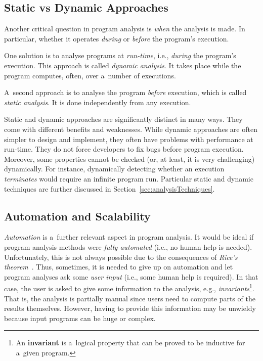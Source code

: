 \subsection{Static vs Dynamic Approaches}

Another critical question in program analysis is \emph{when} the analysis is made. In particular, whether it operates \emph{during} or \emph{before} the program's execution.

One solution is to analyse programs at \emph{run-time}, i.e., \emph{during} the program's execution. This approach is called \emph{dynamic analysis}. It takes place while the program computes, often, over a~number of executions.

A~second approach is to analyse the program \emph{before} execution, which is called \emph{static analysis}. It is done independently from any execution.

Static and dynamic approaches are significantly distinct in many ways. They come with different benefits and weaknesses. While dynamic approaches are often simpler to design and implement, they often have problems with performance at run-time. They do not force developers to fix  bugs before program execution. Moreover, some properties cannot be checked (or, at least, it is very challenging) dynamically. For instance, dynamically detecting whether an execution \emph{terminates} would require an infinite program run. Particular static and dynamic techniques are further discussed in Section~\ref{sec:analysisTechniques}.

\subsection{Automation and Scalability}

\emph{Automation} is a~further relevant aspect in program analysis. It would be ideal if program analysis methods were \emph{fully automated} (i.e., no human help is needed). Unfortunately, this is not always possible due to the consequences of \emph{Rice's theorem}~\cite{rice}. Thus, sometimes, it is needed to give up on automation and let program analyses ask some \emph{user input} (i.e., some human help is required). In that case, the user is asked to give some information to the analysis, e.g., \emph{invariants}\footnote{An \textbf{invariant} is a~logical property that can be proved to be inductive for a~given program.}. That is, the analysis is partially manual since users need to compute parts of the results themselves. However, having to provide this information may be unwieldy because input programs can be huge or complex.

